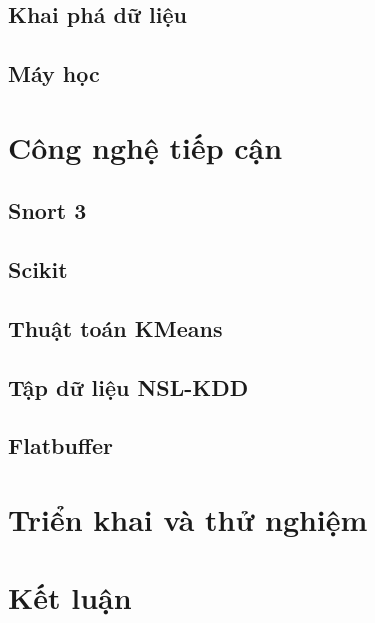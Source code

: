 \documentclass[12pt,twoside]{report}
\begin{document}
\section{Khai phá dữ liệu}

\section{Máy học}

\newpage
\chapter{Công nghệ tiếp cận}
\section{Snort 3}

\section{Scikit}

\section{Thuật toán KMeans}

\section{Tập dữ liệu NSL-KDD}

\section{Flatbuffer}

\newpage
\chapter{Triển khai và thử nghiệm}

\newpage
\chapter{Kết luận}

\end{document}
